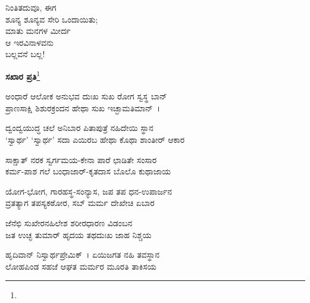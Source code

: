 \begin{myquote}
ನಿಂತಿತದುವೂ, ಈಗ\\ಶೂನ್ಯ ಶೂನ್ಯವ ಸೇರಿ ಒಂದಾಯಿತು;\\ಮಾತು ಮನಗಳ ಮೀರ್ದ\\ಆ ಇರವಿನಾಳವನು\\ಬಲ್ಲವನೆ ಬಲ್ಲ!
\end{myquote}

\begin{center}
\textbf{ಸಖಾರ ಪ್ರತಿ}\footnote{}
\end{center}

\begin{myquote}
ಅಂಧಾರೆ ಆಲೋಕ ಅನುಭವ ದುಃಖ ಸುಖ ರೋಗ ಸ್ವಸ್ಥ ಬಾನ್\\ಪ್ರಾಣಸಾಕ್ಷಿ ಶಿಶುರಕ್ರಂದನ ಹೇಥಾ ಸುಖ ಇಚ್ಛಾಮತಿಮಾನ್~।
\end{myquote}


\begin{myquote}
ದ್ವಂದ್ವಯುದ್ಧ ಚಲೆ ಅನಿಬಾರ ಪಿತಾಪುತ್ರೆ ನಹಿದೇಯಿ ಸ್ಥಾನ\\‘ಸ್ವಾರ್ಥ’ ‘ಸ್ವಾರ್ಥ’ ಸದಾ ಎಯಿರಬ ಹೇಥಾ ಕೊಥಾ ಶಾಂತೀರ್ ಆಕಾರ
\end{myquote}


\begin{myquote}
ಸಾಕ್ಷಾತ್ ನರಕ ಸ್ವರ್ಗಮಯ-ಕೇನಾ ಪಾರೆ ಛಾಡಿತೇ ಸಂಸಾರ\\ಕರ್ಮ-ಪಾಶ ಗಲೆ ಬಂಧಾಜಾರ್-ಕೃತದಾಸ ಬೊಲೊ ಕುಥಾಜಾಯ
\end{myquote}


\begin{myquote}
ಯೋಗ-ಭೋಗ, ಗಾರಹಸ್ಥ-ಸಂನ್ಯಾಸ, ಜಪ ತಪ ಧನ-ಉಪಾರ್ಜನ\\ವ್ರತತ್ಯಾಗ ತಪಸ್ಯಕಠೋರ, ಸಬ್ ಮರ್ಮ ದೇಖೇಚಿ ಏಬಾರ
\end{myquote}


\begin{myquote}
ಜೆನೆಛಿ ಸುಖೇರನಹಿಲೇಶ ಶರೀರಧಾರಣ ವಿಡಂಬನ\\ಜತ ಉಚ್ಛ ತುಮಾರ್‌ ಹೃದಯ ತಥದುಃಖ ಜಾಹ ನಿಶ್ಚಯ
\end{myquote}


\begin{myquote}
ಹೃದಿವಾನ್ ನಿಸ್ವಾರ್ಥಪ್ರೇಮಿಕ್~। ಏಯಿಜಗತ ನಹಿ ತವಸ್ಥಾನ\\ಲೋಹಪಿಂಡ ಸಹಜೆ ಆಘತ ಮರ್ಮರ ಮೂರತಿ ತಾಕಿಸಯ
\end{myquote}


